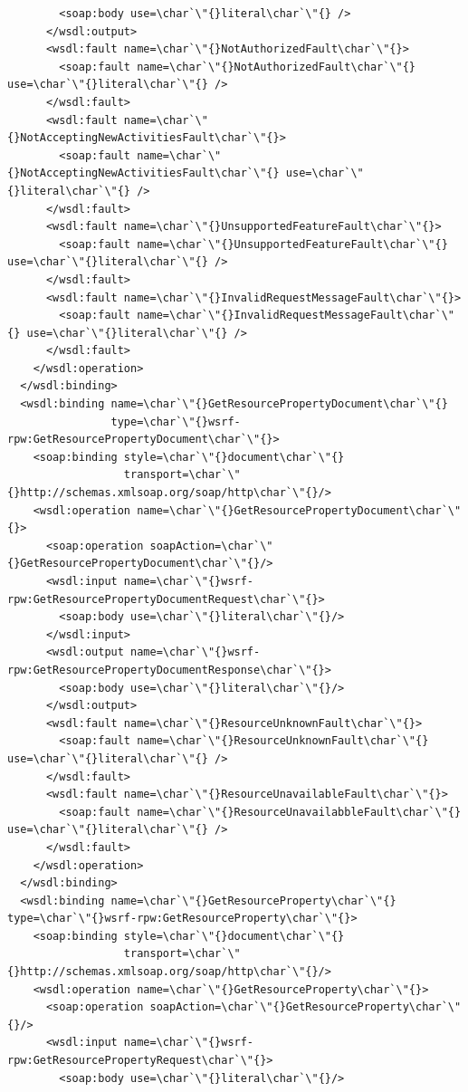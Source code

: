 \documentclass{article}                            %
\begin{document}
\begin{footnotesize}
\begin{verbatim}
        <soap:body use=\char`\"{}literal\char`\"{} />
      </wsdl:output>
      <wsdl:fault name=\char`\"{}NotAuthorizedFault\char`\"{}>
        <soap:fault name=\char`\"{}NotAuthorizedFault\char`\"{} use=\char`\"{}literal\char`\"{} />
      </wsdl:fault>
      <wsdl:fault name=\char`\"{}NotAcceptingNewActivitiesFault\char`\"{}>
        <soap:fault name=\char`\"{}NotAcceptingNewActivitiesFault\char`\"{} use=\char`\"{}literal\char`\"{} />
      </wsdl:fault>
      <wsdl:fault name=\char`\"{}UnsupportedFeatureFault\char`\"{}>
        <soap:fault name=\char`\"{}UnsupportedFeatureFault\char`\"{} use=\char`\"{}literal\char`\"{} />
      </wsdl:fault>
      <wsdl:fault name=\char`\"{}InvalidRequestMessageFault\char`\"{}>
        <soap:fault name=\char`\"{}InvalidRequestMessageFault\char`\"{} use=\char`\"{}literal\char`\"{} />
      </wsdl:fault>
    </wsdl:operation> 
  </wsdl:binding>
  <wsdl:binding name=\char`\"{}GetResourcePropertyDocument\char`\"{}
                type=\char`\"{}wsrf-rpw:GetResourcePropertyDocument\char`\"{}>
    <soap:binding style=\char`\"{}document\char`\"{}
                  transport=\char`\"{}http://schemas.xmlsoap.org/soap/http\char`\"{}/>
    <wsdl:operation name=\char`\"{}GetResourcePropertyDocument\char`\"{}>
      <soap:operation soapAction=\char`\"{}GetResourcePropertyDocument\char`\"{}/>
      <wsdl:input name=\char`\"{}wsrf-rpw:GetResourcePropertyDocumentRequest\char`\"{}>
        <soap:body use=\char`\"{}literal\char`\"{}/>
      </wsdl:input>
      <wsdl:output name=\char`\"{}wsrf-rpw:GetResourcePropertyDocumentResponse\char`\"{}>
        <soap:body use=\char`\"{}literal\char`\"{}/>
      </wsdl:output>
      <wsdl:fault name=\char`\"{}ResourceUnknownFault\char`\"{}>
        <soap:fault name=\char`\"{}ResourceUnknownFault\char`\"{} use=\char`\"{}literal\char`\"{} />
      </wsdl:fault>
      <wsdl:fault name=\char`\"{}ResourceUnavailableFault\char`\"{}>
        <soap:fault name=\char`\"{}ResourceUnavailabbleFault\char`\"{} use=\char`\"{}literal\char`\"{} />
      </wsdl:fault>
    </wsdl:operation>
  </wsdl:binding>
  <wsdl:binding name=\char`\"{}GetResourceProperty\char`\"{} type=\char`\"{}wsrf-rpw:GetResourceProperty\char`\"{}>
    <soap:binding style=\char`\"{}document\char`\"{}
                  transport=\char`\"{}http://schemas.xmlsoap.org/soap/http\char`\"{}/>
    <wsdl:operation name=\char`\"{}GetResourceProperty\char`\"{}>
      <soap:operation soapAction=\char`\"{}GetResourceProperty\char`\"{}/>
      <wsdl:input name=\char`\"{}wsrf-rpw:GetResourcePropertyRequest\char`\"{}>
        <soap:body use=\char`\"{}literal\char`\"{}/>

\end{verbatim}
\end{footnotesize}
\end{document}
